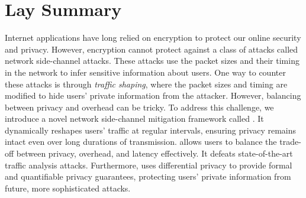

\chapter{Lay Summary}
Internet applications have long relied on encryption to protect our online security and privacy.
However, encryption cannot protect against a class of attacks called network side-channel attacks.
These attacks use the packet sizes and their timing in the network to infer sensitive information about users.
One way to counter these attacks is through \emph{traffic shaping}, where the packet sizes and timing are modified to hide users' private information from the attacker.
However, balancing between privacy and overhead can be tricky.
To address this challenge, we introduce a novel network side-channel mitigation framework called {\sys}.
It dynamically reshapes users' traffic at regular intervals, ensuring privacy remains intact even over long durations of transmission.
{\sys} allows users to balance the trade-off between privacy, overhead, and latency effectively.
It defeats state-of-the-art traffic analysis attacks.
Furthermore, {\sys} uses differential privacy to provide formal and quantifiable privacy guarantees, protecting users' private information from future, more sophisticated attacks.

